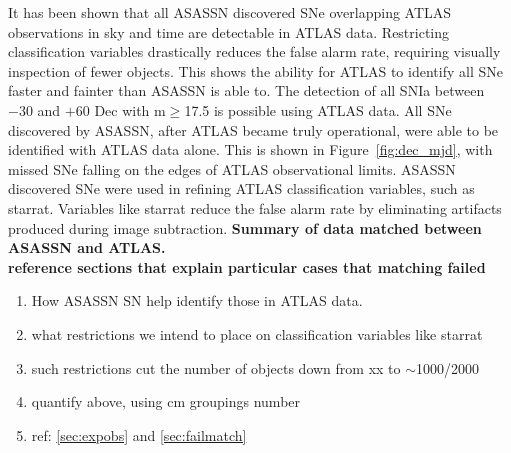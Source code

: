 \documentclass[aps,prb,twocolumn,superscriptaddress]{revtex4-1}
\begin{document}
\indent It has been shown that all ASASSN discovered SNe overlapping ATLAS 
observations in sky and time are detectable in ATLAS data. Restricting 
classification variables drastically reduces the false alarm rate, requiring 
visually inspection of fewer objects. This shows the ability for ATLAS to 
identify all SNe faster and fainter than ASASSN is able to.
%
\indent The detection of all SNIa between $-30$ and 
$+60$ Dec with m$\geq$17.5 is possible using ATLAS data.  
All SNe discovered by ASASSN, after ATLAS became truly operational, were 
able to be identified with ATLAS data alone.  This is shown in 
Figure~\ref{fig:dec_mjd}, with missed SNe falling on the edges of ATLAS 
observational limits.
%
\indent ASASSN discovered SNe were used in refining ATLAS classification 
variables, such as starrat.  Variables like starrat reduce the 
false alarm rate by eliminating artifacts produced during image 
subtraction.  
{\bf Summary of data matched between ASASSN and ATLAS.\\
reference sections that explain particular cases that matching failed}
\begin{enumerate}
  \item{} How ASASSN SN help identify those in ATLAS data.
	\item{} what restrictions we intend to place on classification variables like starrat
	\item{} such restrictions cut the number of objects down from xx to $\sim$1000/2000
  \item{} \indent quantify above, using cm groupings number
  \item{} ref: \cref{sec:expobs} and \cref{sec:failmatch}
\end{enumerate}
\end{document}
